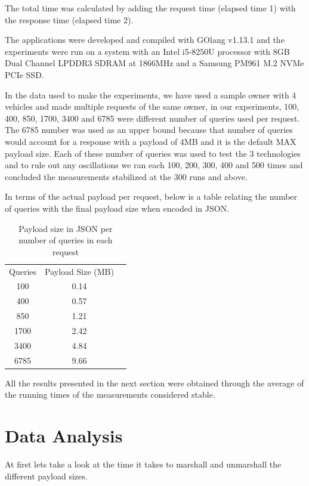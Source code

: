 \documentclass{article}
\begin{document}
\qquad The total time was calculated by adding the request time (elapsed time 1) with the response time (elapsed time 2).

\qquad The applications were developed and compiled with GOlang v1.13.1 and the experiments were run on a system with an Intel i5-8250U processor with 8GB Dual Channel LPDDR3 SDRAM at 1866MHz and a Samsung PM961 M.2 NVMe PCIe SSD. 

\qquad In the data used to make the experiments, we have used a sample owner with 4 vehicles and made multiple requests of the same owner, in our experiments, 100, 400, 850, 1700, 3400 and 6785 were different number of queries used per request. The 6785 number was used as an upper bound because that number of queries would account for a response with a payload of 4\ac{MB} and it is the default MAX payload size. Each of these number of queries was used to test the 3 technologies and to rule out any oscillations we ran each 100, 200, 300, 400 and 500 times and concluded the measurements stabilized at the 300 runs and above.

\qquad In terms of the actual payload per request, below is a table relating the number of queries with the final payload size when encoded in \ac{JSON}.

\begin{table}[ht]
\centering
\begin{tabular}{ c c c }
Queries & Payload Size (\ac{MB}) \\ 
100 & 0.14 \\  
400 & 0.57 \\
850 & 1.21 \\  
1700 & 2.42 \\
3400 & 4.84 \\
6785 & 9.66 \\
\end{tabular}
\caption{Payload size in \ac{JSON} per number of queries in each request}
\label{table:1}
\end{table}

\qquad All the results presented in the next section were obtained through the average of the running times of the measurements considered stable.

\section{Data Analysis}

\qquad At first lets take a look at the time it takes to marshall and unmarshall the different payload sizes.
\end{document}
